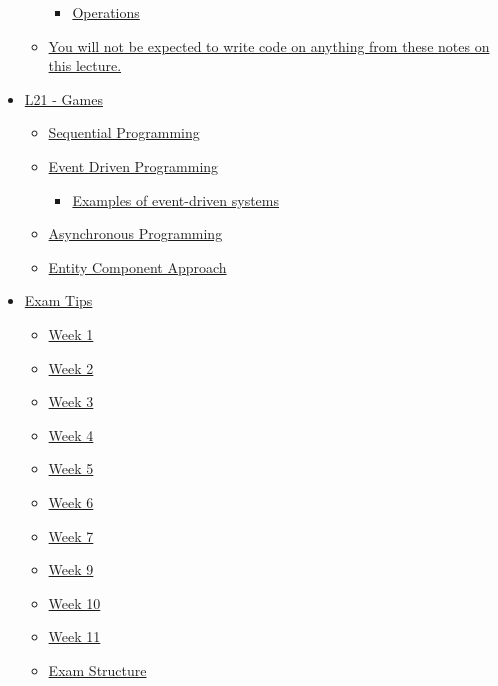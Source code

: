 \documentclass[]{article}
\providecommand{\tightlist}{%
  \setlength{\itemsep}{0pt}\setlength{\parskip}{0pt}}
\begin{document}
\begin{itemize}
\begin{itemize}
    \begin{itemize}
    \tightlist
    \item
      \protect\hyperlink{operations}{Operations}
    \end{itemize}
  \item
    \protect\hyperlink{you-will-not-be-expected-to-write-code-on-anything-from-these-notes-on-this-lecture.}{You
    will not be expected to write code on anything from these notes on
    this lecture.}
  \end{itemize}
\item
  \protect\hyperlink{l21---games}{L21 - Games}

  \begin{itemize}
  \tightlist
  \item
    \protect\hyperlink{sequential-programming}{Sequential Programming}
  \item
    \protect\hyperlink{event-driven-programming}{Event Driven
    Programming}

    \begin{itemize}
    \tightlist
    \item
      \protect\hyperlink{examples-of-event-driven-systems}{Examples of
      event-driven systems}
    \end{itemize}
  \item
    \protect\hyperlink{asynchronous-programming}{Asynchronous
    Programming}
  \item
    \protect\hyperlink{entity-component-approach}{Entity Component
    Approach}
  \end{itemize}
\item
  \protect\hyperlink{exam-tips}{Exam Tips}

  \begin{itemize}
  \tightlist
  \item
    \protect\hyperlink{week-1}{Week 1}
  \item
    \protect\hyperlink{week-2}{Week 2}
  \item
    \protect\hyperlink{week-3}{Week 3}
  \item
    \protect\hyperlink{week-4}{Week 4}
  \item
    \protect\hyperlink{week-5}{Week 5}
  \item
    \protect\hyperlink{week-6}{Week 6}
  \item
    \protect\hyperlink{week-7}{Week 7}
  \item
    \protect\hyperlink{week-9}{Week 9}
  \item
    \protect\hyperlink{week-10}{Week 10}
  \item
    \protect\hyperlink{week-11}{Week 11}
  \item
    \protect\hyperlink{exam-structure}{Exam Structure}


\end{itemize}
\end{itemize}
\end{document}
